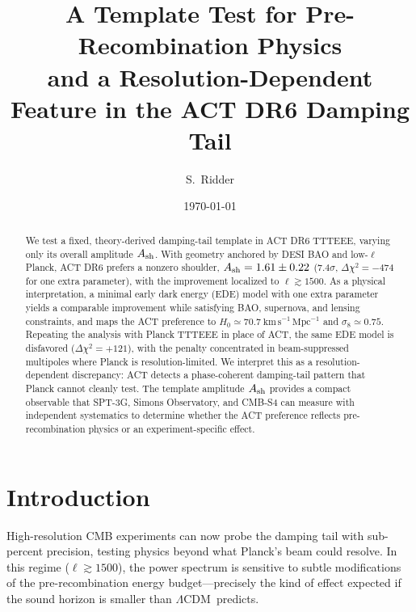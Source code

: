 \documentclass[onecolumn,showpacs,preprintnumbers,amsmath,amssymb,prd]{revtex4-2}
\newcommand{\lcdm}{$\Lambda$CDM}
\begin{document}
\title{A Template Test for Pre-Recombination Physics\\
and a Resolution-Dependent Feature in the ACT DR6 Damping Tail}

\author{S.~Ridder}

\date{\today}

\begin{abstract}
We test a fixed, theory-derived damping-tail template in ACT DR6 TTTEEE, varying only its overall amplitude $A_{\rm sh}$. With geometry anchored by DESI BAO and low-$\ell$ Planck, ACT DR6 prefers a nonzero shoulder, $A_{\rm sh} = 1.61 \pm 0.22$ ($7.4\sigma$, $\Delta\chi^2 = -474$ for one extra parameter), with the improvement localized to $\ell \gtrsim 1500$. As a physical interpretation, a minimal early dark energy (EDE) model with one extra parameter yields a comparable improvement while satisfying BAO, supernova, and lensing constraints, and maps the ACT preference to $H_0 \simeq 70.7~\mathrm{km\,s^{-1}\,Mpc^{-1}}$ and $\sigma_8 \simeq 0.75$. Repeating the analysis with Planck TTTEEE in place of ACT, the same EDE model is disfavored ($\Delta\chi^2 = +121$), with the penalty concentrated in beam-suppressed multipoles where Planck is resolution-limited. We interpret this as a resolution-dependent discrepancy: ACT detects a phase-coherent damping-tail pattern that Planck cannot cleanly test. The template amplitude $A_{\rm sh}$ provides a compact observable that SPT-3G, Simons Observatory, and CMB-S4 can measure with independent systematics to determine whether the ACT preference reflects pre-recombination physics or an experiment-specific effect.
\end{abstract}

\maketitle

\section{Introduction}
\label{sec:intro}

High-resolution CMB experiments can now probe the damping tail with sub-percent precision, testing physics beyond what Planck's beam could resolve. In this regime ($\ell \gtrsim 1500$), the power spectrum is sensitive to subtle modifications of the pre-recombination energy budget---precisely the kind of effect expected if the sound horizon is smaller than \lcdm\ predicts.
\end{document}

